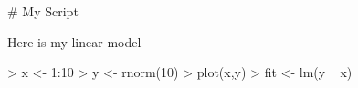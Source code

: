 \documentclass{article}
\begin{document}


# My Script

Here is my linear model


\begin{Schunk}
\begin{Sinput}
> x <- 1:10
> y <- rnorm(10)
> plot(x,y)
> fit <- lm(y ~ x)
\end{Sinput}
\end{Schunk}
\end{document}
